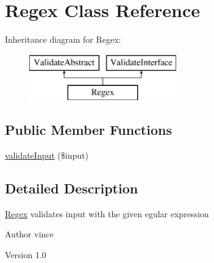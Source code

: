 \hypertarget{class_anemo_1_1_validate_1_1_adapter_1_1_regex}{
\section{Regex Class Reference}
\label{class_anemo_1_1_validate_1_1_adapter_1_1_regex}
}
Inheritance diagram for Regex:\begin{figure}[H]
\begin{center}
\leavevmode
\includegraphics[height=2.000000cm]{class_anemo_1_1_validate_1_1_adapter_1_1_regex}
\end{center}
\end{figure}
\subsection*{Public Member Functions}
\begin{DoxyCompactItemize}
\item 
\hyperlink{class_anemo_1_1_validate_1_1_adapter_1_1_regex_aaa5a5ce40dbb70cc1caa4482c0b7aa33}{validateInput} (\$input)
\end{DoxyCompactItemize}


\subsection{Detailed Description}
\hyperlink{class_anemo_1_1_validate_1_1_adapter_1_1_regex}{Regex} validates input with the given egular expression \begin{DoxyAuthor}{Author}
vince 
\end{DoxyAuthor}
\begin{DoxyVersion}{Version}
1.0 
\end{DoxyVersion}


